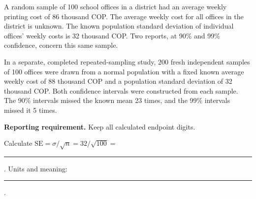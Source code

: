 \vspace{-3mm}
\vspace{-4mm}
A random sample of 100 school offices in a district had an average weekly printing cost of 86 thousand COP. The average weekly cost for all offices in the district is unknown. The known population standard deviation of individual offices' weekly costs is 32 thousand COP. Two reports, at 90\% and 99\% confidence, concern this same sample.

In a separate, completed repeated-sampling study, 200 fresh independent samples of 100 offices were drawn from a normal population with a fixed known average weekly cost of 88 thousand COP and a population standard deviation of 32 thousand COP. Both confidence intervals were constructed from each sample. The 90\% intervals missed the known mean 23 times, and the 99\% intervals missed it 5 times.

\textbf{Reporting requirement.} Keep all calculated endpoint digits.


\par\noindent\begin{minipage}[t]{.49\linewidth}
\vspace{0pt}
\end{minipage}\hfill
\begin{minipage}[t]{.49\linewidth}
\vspace{0pt}
\end{minipage}\par
Calculate $\mathrm{SE}=\sigma/\sqrt n=32/\sqrt{100}=$ \rule{.7in}{.3pt}. Units and meaning: \rule{1.8in}{.3pt}.



